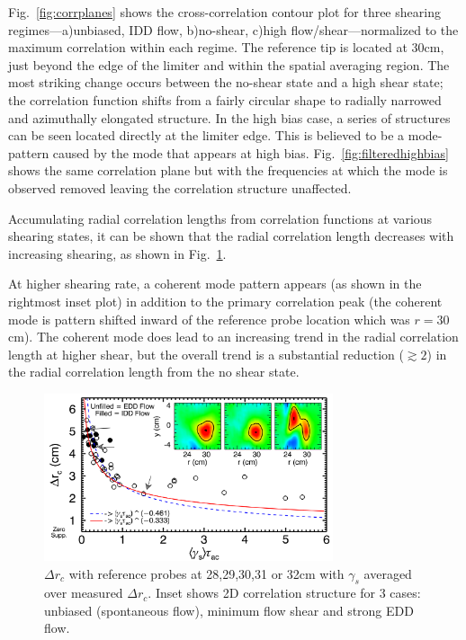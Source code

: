 \documentclass[aip,pop,amsmath,amssymb,preprint,superscriptaddress]{revtex4-1} %
\begin{document}
Fig.~\ref{fig:corrplanes} shows the cross-correlation contour plot for three shearing regimes---a)unbiased, IDD flow, b)no-shear, c)high flow/shear---normalized to the maximum correlation within each regime. The reference tip is located at 30cm, just beyond the edge of the limiter and within the spatial averaging region. The most striking change occurs between the no-shear state and a high shear state; the correlation function shifts from a fairly circular shape to radially narrowed and azimuthally elongated structure. In the high bias case, a series of structures can be seen located directly at the limiter edge. This is believed to be a mode-pattern caused by the mode that appears at high bias. Fig.~\ref{fig:filteredhighbias} shows the same correlation plane but with the frequencies at which the mode is observed removed leaving the correlation structure unaffected.



Accumulating radial correlation lengths from correlation functions at various shearing states, it can be shown that the radial correlation length 
decreases with increasing shearing, as shown in
Fig.~\ref{fig:radcorr}.


At higher shearing rate, a coherent mode
pattern appears (as shown in the rightmost inset plot) in addition to
the primary correlation peak (the coherent mode is
pattern shifted inward of the reference probe location which was $r=30$cm).  The coherent
mode does lead to an increasing trend in the radial correlation length
at higher shear, but the overall trend is a substantial reduction
($\gtrsim 2$) in the radial correlation length from the no shear state.

\begin{figure}[!htbp]
\centerline{
\includegraphics[width=8.5cm]{radcorr}}
\caption{\label{fig:radcorr} $\Delta r_{c}$ with
  reference probes at 28,29,30,31 or 32cm with $\gamma_{s}$ averaged over measured $\Delta r_{c}$.  Inset shows 2D correlation
  structure for 3 cases: unbiased (spontaneous flow), minimum flow
  shear and strong EDD flow.}
\end{figure}
\end{document}
